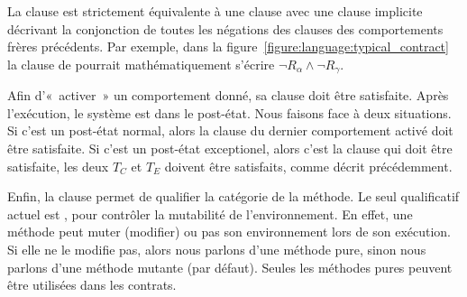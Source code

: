La clause \adefault est strictement équivalente à une clause \abehavior avec une
clause \arequires implicite décrivant la conjonction de toutes les négations des
clauses \arequires des comportements frères précédents.  Par exemple, dans la
figure~\ref{figure:language:typical_contract} la clause \arequires de \adefault
pourrait mathématiquement s'écrire $\neg R_\alpha \land \neg R_\gamma$.

Afin d'«~activer~» un comportement donné, sa clause \arequires doit être
satisfaite. Après l'exécution, le système est dans le post-état. Nous faisons
face à deux situations. Si c'est un post-état normal, alors la clause \aensures
du dernier comportement activé doit être satisfaite. Si c'est un post-état
exceptionel, alors c'est la clause \athrowable qui doit être satisfaite, \ie les
deux $T_C$ et $T_E$ doivent être satisfaits, comme décrit précédemment.

Enfin, la clause \ais permet de qualifier la catégorie de la méthode. Le seul
qualificatif actuel est , pour contrôler la mutabilité de
l'environnement. En effet, une méthode peut muter (modifier) ou pas son
environnement lors de son exécution. Si elle ne le modifie pas, alors nous
parlons d'une méthode {\strong pure}, sinon nous parlons d'une méthode {\strong
mutante} (par défaut). Seules les méthodes pures peuvent être utilisées dans les
contrats.

